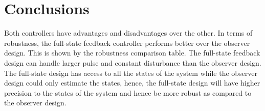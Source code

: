 




\section{Conclusions}
Both controllers have advantages and disadvantages over the other. In terms of robustness, the full-state feedback controller performs better over the observer design. This is shown by the robustness comparison table. The full-state feedback design can handle larger pulse and constant disturbance than the observer design. The full-state design has access to all the states of the system while the observer design could only estimate the states, hence, the full-state design will have higher precision to the states of the system and hence be more robust as compared to the observer design.